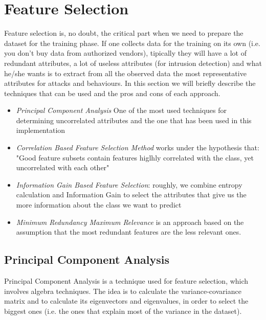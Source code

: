 \chapter{Feature Selection}

Feature selection is, no doubt, the critical part when we need to prepare the dataset for the training phase.\newline
If one collects data for the training on its own (i.e. you don't buy data from authorized vendors), tipically they will have a lot of redundant attributes, a lot of useless attributes (for intrusion detection) and what he/she wants is to extract from all the observed data the most representative attributes for attacks and behaviours.\newline
In this section we will briefly describe the techniques that can be used and the pros and cons of each approach.

\begin{itemize}
	\item \emph{Principal Component Analysis} One of the most used techniques for determining uncorrelated attributes and the one that has been used in this implementation
	\vspace{0.3cm}
	\item \emph{Correlation Based Feature Selection Method} works under the hypothesis that: "Good feature subsets contain features higlhly correlated with the class, yet uncorrelated with each other"
	\vspace{0.3cm}
	\item \emph{Information Gain Based Feature Selection}: roughly, we combine entropy calculation and Information Gain to select the attributes that give us the more information about the class we want to predict
	\vspace{0.3cm}
	\item \emph{Minimum Redundancy Maximum Relevance} is an approach based on the assumption that the most redundant features are the less relevant ones.
\end{itemize}

\section{Principal Component Analysis}

Principal Component Analysis is a technique used for feature selection, which involves algebra techniques. The idea is to calculate the variance-covariance matrix and to calculate its eigenvectors and eigenvalues, in order to select the biggest ones (i.e. the ones that explain most of the variance in the dataset).\newline\newline
	
